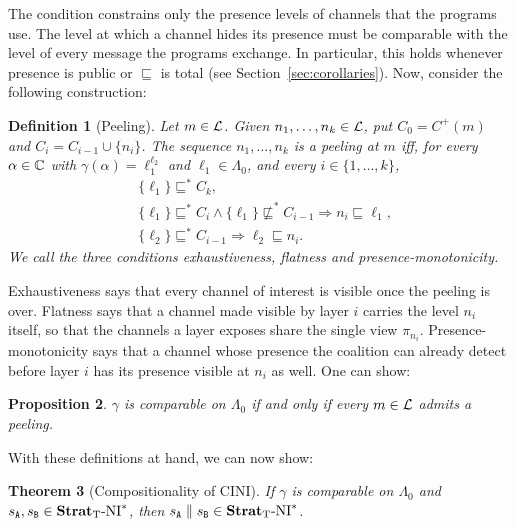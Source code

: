 \documentclass[preprint,5p,twocolumn]{elsarticle}
\newtheorem{theorem}{Theorem}
\newtheorem{definition}[theorem]{Definition}
\newtheorem{proposition}[theorem]{Proposition}
\begin{document}
The condition constrains only the presence levels of channels that the programs use.
The level at which a channel hides its presence must be comparable with the level of
every message the programs exchange. In particular, this holds whenever presence is
public or $\sqsubseteq$ is total (see Section~\ref{sec:corollaries}).
Now, consider the following construction:

\begin{definition}[Peeling]
  \label{def:peeling}
  Let $m \in \mathcal{L}$. Given $n_1,\dots,n_k \in \mathcal{L}$, put $C_0 = C^+(m)$ and
  $C_i = C_{i-1} \cup \lbrace n_i \rbrace$. The sequence $n_1,\dots,n_k$ is a \emph{peeling at $m$}
  iff, for every $\alpha \in \mathbb{C}$ with $\gamma(\alpha) = \ell_1^{\ell_2}$ and
  $\ell_1 \in \Lambda_0$, and every $i \in \lbrace 1,\dots,k \rbrace$,
  \begin{align*}
    &\lbrace \ell_1 \rbrace \sqsubseteq^* C_k, \\
    &\lbrace \ell_1 \rbrace \sqsubseteq^* C_i \land \lbrace \ell_1 \rbrace \not\sqsubseteq^* C_{i-1}
      \Longrightarrow n_i \sqsubseteq \ell_1, \\
    &\lbrace \ell_2 \rbrace \sqsubseteq^* C_{i-1} \Longrightarrow \ell_2 \sqsubseteq n_i.
  \end{align*}
  We call the three conditions \emph{exhaustiveness}, \emph{flatness} and
  \emph{presence-monotonicity}.
\end{definition}

Exhaustiveness says that every channel of interest is visible once the peeling is over. Flatness
says that a channel made visible by layer $i$ carries the level $n_i$ itself, so that the channels
a layer exposes share the single view $\pi_{n_i}$. Presence-monotonicity says that a channel whose
presence the coalition can already detect before layer $i$ has its presence visible at $n_i$ as
well. One can show:

\begin{proposition}
  \label{prop:closed form}
  $\gamma$ is comparable on $\Lambda_0$ if and only if every $m \in \mathcal{L}$ admits a peeling.
\end{proposition}

With these definitions at hand, we can now show:

\begin{theorem}[Compositionality of CINI]
  \label{thm:cini composes}
  If $\gamma$ is comparable on $\Lambda_0$ and $s_{\mathtt{A}}, s_{\mathtt{B}} \in \mathbf{Strat}_{\mathrm{T}}\text{-}\mathrm{NI}^*$, then
  $s_{\mathtt{A}} \parallel s_{\mathtt{B}} \in \mathbf{Strat}_{\mathrm{T}}\text{-}\mathrm{NI}^*$.
\end{theorem}
\end{document}
